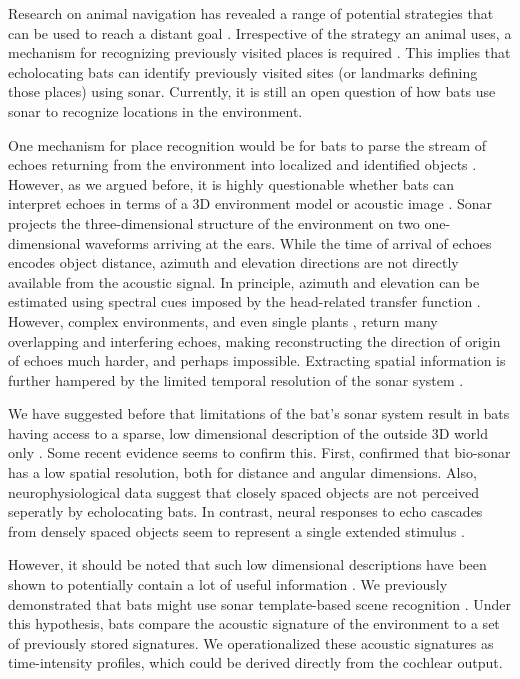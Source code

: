 \documentclass[preprint,5p]{elsarticle}
\begin{document}
Research on animal navigation has revealed a range of potential strategies that can be used to reach a distant goal \citep[Reviewed by][]{Franz2000}. Irrespective of the strategy an animal uses, a mechanism for recognizing previously visited places is required \citep{Vanderelst2016,Vanderelst2017}. This implies that echolocating bats can identify previously visited sites (or landmarks defining those places) using sonar. Currently, it is still an open question of how bats use sonar to recognize locations in the environment.

One mechanism for place recognition would be for bats to parse the stream of echoes returning from the environment into localized and identified objects \citep{Lee2017,Barchi2013,Moss2001,Schnitzler2003,Simmons2012,Ulanovsky2008,Clare2015,Surlykke2016,Geipel2013}. However, as we argued before, it is highly questionable whether bats can interpret echoes in terms of a 3D environment model or acoustic image \citep[e.g.,][]{Vanderelst2015,Vanderelst2016,Steckel2013}. Sonar projects the three-dimensional structure of the environment on two one-dimensional waveforms arriving at the ears. While the time of arrival of echoes encodes object distance, azimuth and elevation directions are not directly available from the acoustic signal. In principle, azimuth and elevation can be estimated using spectral cues imposed by the head-related transfer function \citep[e.g.,][]{Reijniers2010,Aytekin2004}. However, complex environments, and even single plants \citep{Yovel2008,Muller2000}, return many overlapping and interfering echoes, making reconstructing the direction of origin of echoes much harder, and perhaps impossible. Extracting spatial information is further hampered by the limited temporal resolution of the sonar system \citep{Simmons1989,Wiegrebe1996,Surlykke1996}. 

We have suggested before that limitations of the bat's sonar system result in bats having access to a sparse, low dimensional description of the outside 3D world only \citep{Vanderelst2015a,Vanderelst2016}. Some recent evidence seems to confirm this. First, \citet{Geberl2019} confirmed that bio-sonar has a low spatial resolution, both for distance and angular dimensions. Also, neurophysiological data suggest that closely spaced objects are not perceived seperatly by echolocating bats. In contrast, neural responses to echo cascades from densely spaced objects seem to represent a single extended stimulus \citep{Warnecke2018,Knowles2015}.

However, it should be noted that such low dimensional descriptions have been shown to potentially contain a lot of useful information \citep{Kuc1997b,Kuc1997}. We previously demonstrated that bats might use sonar template-based scene recognition \citep{Vanderelst2016,Vanderelst2017}. Under this hypothesis, bats compare the acoustic signature of the environment to a set of previously stored signatures. We operationalized these acoustic signatures as time-intensity profiles, which could be derived directly from the cochlear output.
\end{document}
